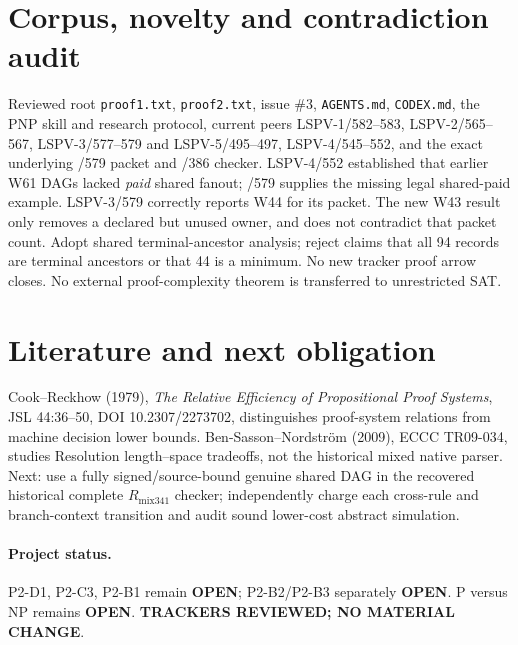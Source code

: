 \documentclass[11pt]{article}
\begin{document}
\section*{Corpus, novelty and contradiction audit}
Reviewed root \texttt{proof1.txt}, \texttt{proof2.txt}, issue \#3, \texttt{AGENTS.md}, \texttt{CODEX.md}, the PNP skill and research protocol, current peers LSPV-1/582--583, LSPV-2/565--567, LSPV-3/577--579 and LSPV-5/495--497, LSPV-4/545--552, and the exact underlying /579 packet and /386 checker. LSPV-4/552 established that earlier W61 DAGs lacked \emph{paid} shared fanout; /579 supplies the missing legal shared-paid example. LSPV-3/579 correctly reports W44 for its packet. The new W43 result only removes a declared but unused owner, and does not contradict that packet count. Adopt shared terminal-ancestor analysis; reject claims that all 94 records are terminal ancestors or that 44 is a minimum. No new tracker proof arrow closes. No external proof-complexity theorem is transferred to unrestricted SAT.
\section*{Literature and next obligation}
Cook--Reckhow (1979), \emph{The Relative Efficiency of Propositional Proof Systems}, JSL 44:36--50, DOI 10.2307/2273702, distinguishes proof-system relations from machine decision lower bounds. Ben-Sasson--Nordstr\"om (2009), ECCC TR09-034, studies Resolution length--space tradeoffs, not the historical mixed native parser. Next: use a fully signed/source-bound genuine shared DAG in the recovered historical complete \(R_{\mathrm{mix341}}\) checker; independently charge each cross-rule and branch-context transition and audit sound lower-cost abstract simulation.
\paragraph{Project status.} P2-D1, P2-C3, P2-B1 remain \textbf{OPEN}; P2-B2/P2-B3 separately \textbf{OPEN}. P versus NP remains \textbf{OPEN}. \textbf{TRACKERS REVIEWED; NO MATERIAL CHANGE}.
\end{document}
